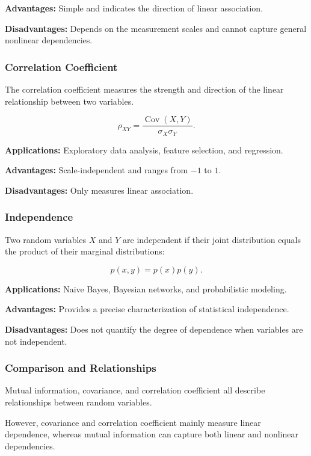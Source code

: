 \documentclass[10pt,a4paper]{article}
\begin{document}
		\textbf{Advantages:} Simple and indicates the direction
		of linear association.
		
		\textbf{Disadvantages:} Depends on the measurement scales
		and cannot capture general nonlinear dependencies.
		
		
		\subsubsection{Correlation Coefficient}
		
		The correlation coefficient measures the strength and
		direction of the linear relationship between two variables.
		
		\[
		\rho_{XY}=
		\frac{\operatorname{Cov}(X,Y)}
		{\sigma_X\sigma_Y}.
		\]
		
		\textbf{Applications:}
		Exploratory data analysis, feature selection, and regression.
		
		\textbf{Advantages:} Scale-independent and ranges from
		$-1$ to $1$.
		
		\textbf{Disadvantages:} Only measures linear association.
		
		
		\subsubsection{Independence}
		
		Two random variables $X$ and $Y$ are independent if their
		joint distribution equals the product of their marginal
		distributions:
		
		\[
		p(x,y)=p(x)p(y).
		\]
		
		\textbf{Applications:}
		Naive Bayes, Bayesian networks, and probabilistic modeling.
		
		\textbf{Advantages:} Provides a precise characterization
		of statistical independence.
		
		\textbf{Disadvantages:} Does not quantify the degree of
		dependence when variables are not independent.
		
		
		\subsubsection{Comparison and Relationships}
		
		Mutual information, covariance, and correlation coefficient
		all describe relationships between random variables.
		
		However, covariance and correlation coefficient mainly
		measure linear dependence, whereas mutual information can
		capture both linear and nonlinear dependencies.
		
\end{document}
